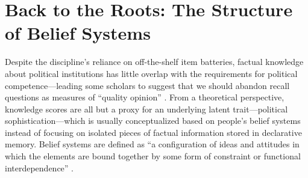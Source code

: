 \section*{Back to the Roots: The Structure of Belief Systems}



Despite the discipline's reliance on off-the-shelf item batteries, factual knowledge about political institutions has little overlap with the requirements for political competence---leading some scholars to suggest that we should abandon recall questions as measures of ``quality opinion'' \citep{druckman2014pathologies}. From a theoretical perspective, knowledge scores are all but a proxy for an underlying latent trait---political sophistication---which is usually conceptualized based on people's belief systems instead of focusing on isolated pieces of factual information stored in declarative memory. Belief systems are defined as ``a configuration of ideas and attitudes in which the elements are bound together by some form of constraint or functional interdependence'' \citep[207]{converse1964nature}.

